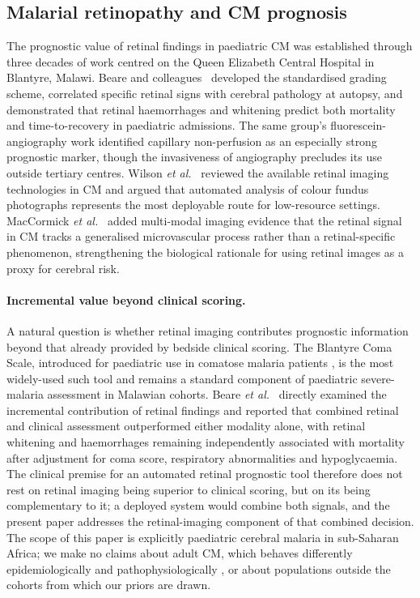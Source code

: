 \documentclass[twocolumn,10pt]{article}
\begin{document}
\subsection{Malarial retinopathy and CM prognosis}
The prognostic value of retinal findings in paediatric CM was
established through three decades of work centred on the Queen
Elizabeth Central Hospital in Blantyre, Malawi. Beare and
colleagues\ \cite{BeareArch2004,Beare2006,Beare2009,BeareEye2023}
developed the standardised grading scheme, correlated specific
retinal signs with cerebral pathology at autopsy, and demonstrated
that retinal haemorrhages and whitening predict both mortality and
time-to-recovery in paediatric admissions. The same group's
fluorescein-angiography work \cite{Barrera2018} identified
capillary non-perfusion as an especially strong prognostic
marker, though the invasiveness of angiography precludes its use
outside tertiary centres. Wilson \emph{et al.}\ \cite{Wilson2023}
reviewed the available retinal imaging technologies in CM and
argued that automated analysis of colour fundus photographs
represents the most deployable route for low-resource settings.
MacCormick \emph{et al.}\ \cite{MacCormick2020} added multi-modal
imaging evidence that the retinal signal in CM tracks a
generalised microvascular process rather than a retinal-specific
phenomenon, strengthening the biological rationale for using
retinal images as a proxy for cerebral risk.

\paragraph{Incremental value beyond clinical scoring.}
A natural question is whether retinal imaging contributes
prognostic information beyond that already provided by bedside
clinical scoring. The Blantyre Coma Scale, introduced for
paediatric use in comatose malaria patients
\cite{Molyneux1989BCS}, is the most widely-used such tool and
remains a standard component of paediatric severe-malaria
assessment in Malawian cohorts. Beare \emph{et al.}\
\cite{Beare2009} directly examined the incremental contribution
of retinal findings and reported that combined retinal and
clinical assessment outperformed either modality alone, with
retinal whitening and haemorrhages remaining independently
associated with mortality after adjustment for coma score,
respiratory abnormalities and hypoglycaemia. The clinical
premise for an automated retinal prognostic tool therefore does
not rest on retinal imaging being superior to clinical scoring,
but on its being complementary to it; a deployed system would
combine both signals, and the present paper addresses the
retinal-imaging component of that combined decision. The scope
of this paper is explicitly paediatric cerebral malaria in
sub-Saharan Africa; we make no claims about adult CM, which
behaves differently epidemiologically and pathophysiologically
\cite{Dondorp2010}, or about populations outside the cohorts
from which our priors are drawn.
\end{document}
